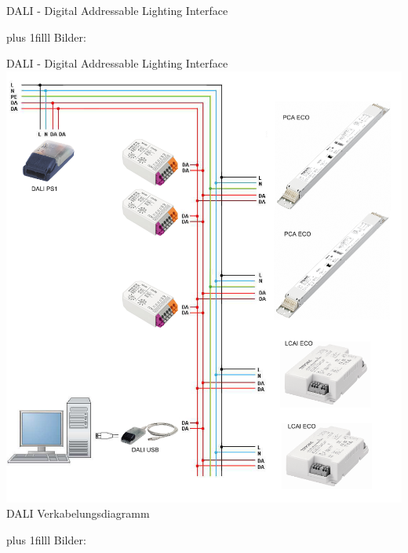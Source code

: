\documentclass[Nike]{tuberlinbeamer}
\newcommand{\customcite}[1]{
	\vskip0pt plus 1filll
	\color{grau}
	\raggedleft \tiny Bilder: \cite{#1}
}
\begin{document}
\begin{frame}{DALI - Digital Addressable Lighting Interface}
	\customcite{dmx_demo, dmx_cable}
\end{frame}


\begin{frame}{DALI - Digital Addressable Lighting Interface}
	\centering
	\includegraphics[width=\textwidth/2 - 25pt]{pictures/DaliInstallation.png}\\
	DALI Verkabelungsdiagramm
	\customcite{rpi}
\end{frame}
\end{document}
